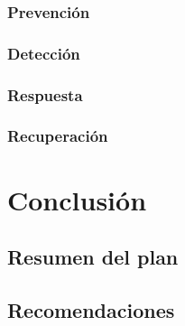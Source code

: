        \subsubsection{Prevención}
        

        \subsubsection{Detección}
        
        \subsubsection{Respuesta}
        
        \subsubsection{Recuperación}


        




        
        

\section{Conclusión}
    \subsection{Resumen del plan}
   

    \subsection{Recomendaciones}
    